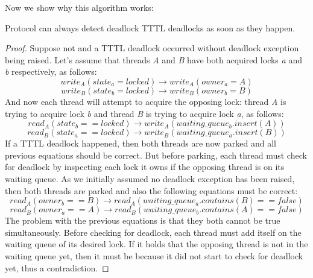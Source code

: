 Now we show why this algorithm works:

\begin{lemma}
Protocol can always detect deadlock TTTL deadlocks as soon as they happen.
\end{lemma}
\begin{proof}
Suppose not and a TTTL deadlock occurred without deadlock exception being raised.
Let's assume that threads \emph{A} and \emph{B} have both acquired locks \emph{a} and \emph{b} respectively, as follows:
\begin{equation}
write_{A}(state_{a} = locked) \rightarrow write_{A}(owner_{a} = A)
\end{equation}
\begin{equation}
write_{B}(state_{b} = locked) \rightarrow write_{B}(owner_{b} = B)
\end{equation}
And now each thread will attempt to acquire the opposing lock: thread \emph{A} is trying to acquire lock \emph{b} and thread \emph{B} is trying to acquire lock \emph{a}, as follows:
\begin{equation}
read_{A}(state_{b} == locked) \rightarrow write_{A}(waiting\_queue_{b}.insert(A))
\end{equation}
\begin{equation}
read_{B}(state_{a} == locked) \rightarrow write_{B}(waiting\_queue_{a}.insert(B))
\end{equation}
If a TTTL deadlock happened, then both threads are now parked and all previous equations should be correct.
But before parking, each thread must check for deadlock by inspecting each lock it owns if the opposing thread is on its waiting queue.
As we initially assumed no deadlock exception has been raised, then both threads are parked and also the following equations must be correct:
\begin{equation}
read_{A}(owner_{b} == B) \rightarrow read_{A}(waiting\_queue_{a}.contains(B) == false)
\end{equation}
\begin{equation}
read_{B}(owner_{a} == A) \rightarrow read_{B}(waiting\_queue_{b}.contains(A) == false)
\end{equation}
The problem with the previous equations is that they both cannot be true simultaneously.
Before checking for deadlock, each thread must add itself on the waiting queue of its desired lock.
If it holds that the opposing thread is not in the waiting queue yet, then it must be because it did not start to check for deadlock yet, thus a contradiction.
\end{proof}

